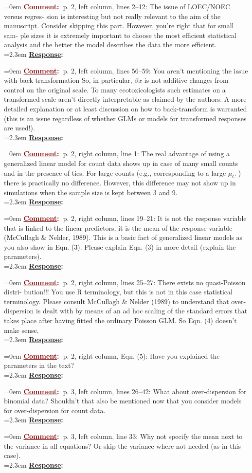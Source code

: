 \documentclass[12pt]{article}
\newcommand{\comment}[0]{\vspace{1em} \noindent \hangindent=0em \textbf{\textcolor{Maroon}{\uline{Comment}:~}}}
\newcommand{\response}[0]{\\\vspace{0.1em} \hangindent=2.3em \textbf{\textcolor{NavyBlue}{\uline{Response}:~}}}
\begin{document}
\comment p. 2, left column, lines 2–12: The issue of LOEC/NOEC versus regres-
sion is interesting but not really relevant to the aim of the manuscript.
Consider skipping this part. However, you’re right that for small sam-
ple sizes it is extremely important to choose the most efficient statistical
analysis and the better the model describes the data the more efficient.
\response

\comment p. 2, left column, lines 56–59: You aren’t mentioning the issue with
back-transformation So, in particular, $\beta x$ is not additive changes from
control on the original scale. To many ecotoxicologists such estimates
on a transformed scale aren’t directly interpretable as claimed by the
authors. A more detailed explanation or at least discussion on how
to back-transform is warranted (this is an issue regardless of whether
GLMs or models for transformed responses are used!).
\response

\comment p. 2, right column, line 1: The real advantage of using a generalized
linear model for count data shows up in case of many small counts and
in the presence of ties. For large counts (e.g., corresponding to a large
$\mu_C$ ) there is practically no difference. However, this difference may not
show up in simulations when the sample size is kept between 3 and 9.
\response

\comment p. 2, right column, lines 19–21: It is not the response variable that is
linked to the linear predictors, it is the mean of the response variable
(McCullagh \& Nelder, 1989). This is a basic fact of generalized linear
models as you also show in Eqn. (3). Please explain Eqn. (3) in more
detail (explain the parameters).
\response

\comment p. 2, right column, lines 25–27: There exists no quasi-Poisson distri-
bution!!! You use R terminology, but this is not in this case statistical
terminology. Please consult McCullagh \& Nelder (1989) to understand
that over-dispersion is dealt with by means of an ad hoc scaling of the
standard errors that takes place after having fitted the ordinary Poisson
GLM. So Eqn. (4) doesn’t make sense.
\response

\comment p. 2, right column, Eqn. (5): Have you explained the parameters in
the text?
\response

\comment p. 3, left column, lines 26–42: What about over-dispersion for binomial
data? Shouldn’t that also be mentioned now that you consider models
for over-dispersion for count data.
\response

\comment p. 3, left column, line 33: Why not specify the mean next to the
variance in all equations? Or skip the variance where not needed (as
in this case).
\response
\end{document}
